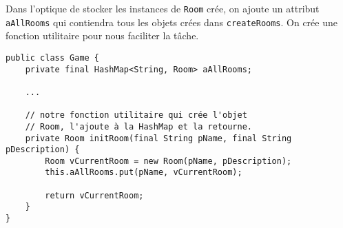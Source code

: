 \begin{exercise}[subtitle=Les objets Room]

Dans l'optique de stocker les instances de \verb|Room| crée, on ajoute un attribut \verb|aAllRooms| qui contiendra tous les objets crées dans \verb|createRooms|. On crée une fonction utilitaire pour nous faciliter la tâche.

\begin{verbatim}
public class Game {
    private final HashMap<String, Room> aAllRooms;

    ... 

    // notre fonction utilitaire qui crée l'objet 
    // Room, l'ajoute à la HashMap et la retourne.
    private Room initRoom(final String pName, final String pDescription) {
        Room vCurrentRoom = new Room(pName, pDescription);
        this.aAllRooms.put(pName, vCurrentRoom);

        return vCurrentRoom;
    }
}
\end{verbatim}
\end{exercise}
